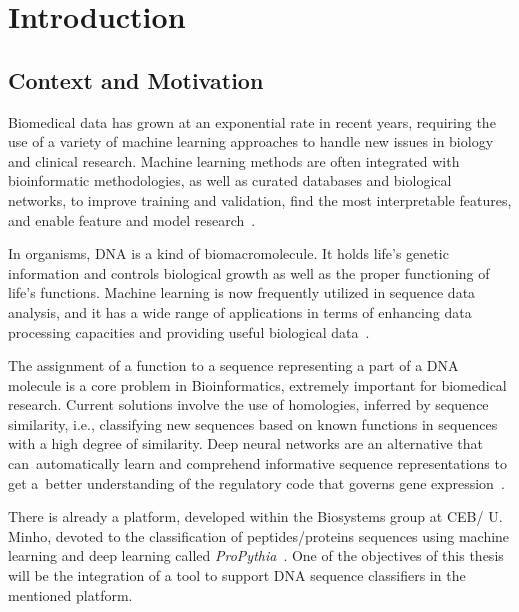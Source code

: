 \newcommand{\novathesis}{\emph{novathesis}}
\newcommand{\novathesisclass}{\texttt{novathesis.cls}}


\chapter{Introduction}
\label{cha:introduction}

\section{Context and Motivation} \label{sec:context_and_motivation}

Biomedical data has grown at an exponential rate in recent years, requiring the use of a variety of machine learning approaches to handle new issues in biology and clinical research. Machine learning methods are often integrated with bioinformatic methodologies, as well as curated databases and biological networks, to improve training and validation, find the most interpretable features, and enable feature and model research~\cite{Auslander2021IncorporatingFrameworks}.

In organisms, DNA is a kind of biomacromolecule. It holds life's genetic information and controls biological growth as well as the proper functioning of life's functions. Machine learning is now frequently utilized in sequence data analysis, and it has a wide range of applications in terms of enhancing data processing capacities and providing useful biological data~\cite{Yang2020ReviewDNA}.

The assignment of a function to a sequence representing a part of a DNA molecule is a core problem in Bioinformatics, extremely important for biomedical research. Current solutions involve the use of homologies, inferred by sequence similarity, i.e., classifying new sequences based on known functions in sequences with a high degree of similarity. Deep neural networks are an alternative that can automatically learn and comprehend informative sequence representations to get a better understanding of the regulatory code that governs gene expression~\cite{Zrimec2021LearningExpression}.

There is already a platform, developed within the Biosystems group at CEB/ U. Minho, devoted to the classification of peptides/proteins sequences using machine learning and deep learning called \textit{ProPythia}~\cite{Sequeira2020ProPythia:Learning}. One of the objectives of this thesis will be the integration of a tool to support DNA sequence classifiers in the mentioned platform.

